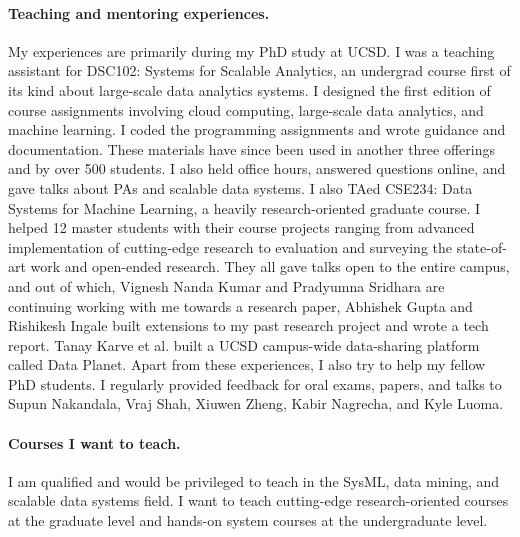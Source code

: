 \documentclass[letterpaper]{article}
\begin{document}
\paragraph{Teaching and mentoring experiences.} My experiences are primarily during my PhD study at UCSD. I was a teaching assistant for DSC102: Systems for Scalable Analytics, an undergrad course first of its kind about large-scale data analytics systems. I designed the first edition of course assignments involving cloud computing, large-scale data analytics, and machine learning. I coded the programming assignments and wrote guidance and documentation. These materials have since been used in another three offerings and by over 500 students. I also held office hours, answered questions online, and gave talks about PAs and scalable data systems. I also TAed CSE234: Data Systems for Machine Learning, a heavily research-oriented graduate course. I helped 12 master students with their course projects ranging from advanced implementation of cutting-edge research to evaluation and surveying the state-of-art work and open-ended research. They all gave talks open to the entire campus, and out of which, Vignesh Nanda Kumar and Pradyumna Sridhara are continuing working with me towards a research paper, Abhishek Gupta and Rishikesh Ingale built extensions to my past research project and wrote a tech report. Tanay Karve et al. built a UCSD campus-wide data-sharing platform called Data Planet. Apart from these experiences, I also try to help my fellow PhD students. I regularly provided feedback for oral exams, papers, and talks to Supun Nakandala, Vraj Shah, Xiuwen Zheng, Kabir Nagrecha, and Kyle Luoma.

\paragraph{Courses I want to teach.} I am qualified and would be privileged to teach in the SysML, data mining, and scalable data systems field. I want to teach cutting-edge research-oriented courses at the graduate level and hands-on system courses at the undergraduate level. 



%
%
\end{document}
